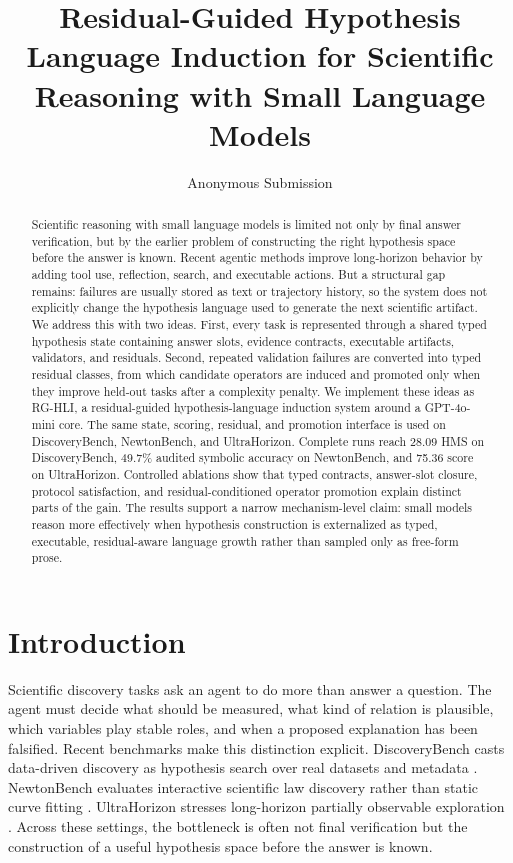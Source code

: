\documentclass[letterpaper]{article}
\title{Residual-Guided Hypothesis Language Induction for Scientific Reasoning with Small Language Models}
\author{Anonymous Submission}
\newcommand{\methodshort}{\textsc{RG-HLI}\xspace}
\newcommand{\gptmini}{GPT-4o-mini\xspace}
\begin{document}
\maketitle
\raggedbottom

\begin{abstract}
Scientific reasoning with small language models is limited not only by final
answer verification, but by the earlier problem of constructing the right
hypothesis space before the answer is known. Recent agentic methods improve
long-horizon behavior by adding tool use, reflection, search, and executable
actions. But a structural gap remains: failures are usually stored as text or
trajectory history, so the system does not explicitly change the hypothesis
language used to generate the next scientific artifact. We address this with
two ideas. First, every task is represented through a shared typed hypothesis
state containing answer slots, evidence contracts, executable artifacts,
validators, and residuals. Second, repeated validation failures are converted
into typed residual classes, from which candidate operators are induced and
promoted only when they improve held-out tasks after a complexity penalty. We
implement these ideas as \methodshort, a residual-guided hypothesis-language
induction system around a \gptmini core. The same state, scoring, residual, and
promotion interface is used on DiscoveryBench, NewtonBench, and UltraHorizon.
Complete runs reach 28.09 HMS on DiscoveryBench, 49.7\% audited symbolic
accuracy on NewtonBench, and 75.36 score on UltraHorizon. Controlled ablations
show that typed contracts, answer-slot closure, protocol satisfaction, and
residual-conditioned operator promotion explain distinct parts of the gain.
The results support a narrow mechanism-level claim: small models reason more
effectively when hypothesis construction is externalized as typed, executable,
residual-aware language growth rather than sampled only as free-form prose.
\end{abstract}

\section{Introduction}

Scientific discovery tasks ask an agent to do more than answer a question. The
agent must decide what should be measured, what kind of relation is plausible,
which variables play stable roles, and when a proposed explanation has been
falsified. Recent benchmarks make this distinction explicit. DiscoveryBench
casts data-driven discovery as hypothesis search over real datasets and
metadata \citep{discoverybench}. NewtonBench evaluates interactive scientific
law discovery rather than static curve fitting \citep{newtonbench}.
UltraHorizon stresses long-horizon partially observable exploration
\citep{ultrahorizon}. Across these settings, the bottleneck is often not final
verification but the construction of a useful hypothesis space before the
answer is known.
\end{document}
